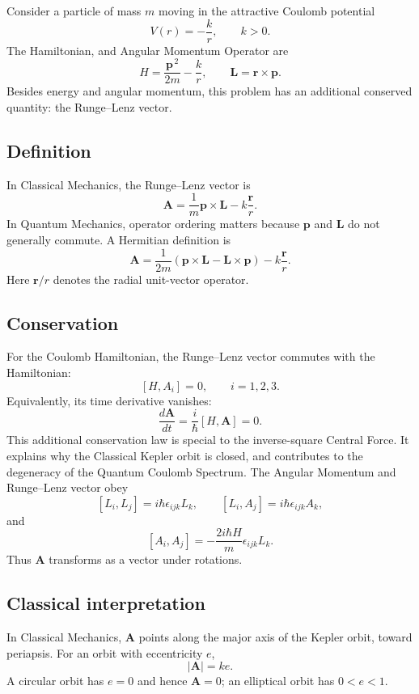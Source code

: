 \documentclass[a4paper, 10pt, onepage]{elegantbook}
\begin{document}
Consider a particle of mass \(m\) moving in the attractive Coulomb
potential
\[
V(r)=-\frac{k}{r},\qquad k>0.
\]
The Hamiltonian, and Angular Momentum Operator are
\[
H=\frac{\mathbf{p}^{\,2}}{2m}-\frac{k}{r},
\qquad
\mathbf{L}=\mathbf{r}\times\mathbf{p}.
\]
Besides energy and angular momentum, this problem has an additional
conserved quantity: the Runge--Lenz vector.

\subsection{Definition}

In Classical Mechanics, the Runge--Lenz vector is
\[
\mathbf{A}
=\frac{1}{m}\mathbf{p}\times\mathbf{L}
-k\frac{\mathbf{r}}{r}.
\]
In Quantum Mechanics, operator ordering matters because
\(\mathbf{p}\) and \(\mathbf{L}\) do not generally commute. A Hermitian
definition is
\[
\boxed{
\mathbf{A}
=\frac{1}{2m}
\left(\mathbf{p}\times\mathbf{L}
      -\mathbf{L}\times\mathbf{p}\right)
-k\frac{\mathbf{r}}{r}
}.
\]
Here \(\mathbf{r}/r\) denotes the radial unit-vector operator.

\subsection{Conservation}

For the Coulomb Hamiltonian, the Runge--Lenz vector commutes with the
Hamiltonian:
\[
[H,A_i]=0,\qquad i=1,2,3.
\]
Equivalently, its time derivative vanishes:
\[
\frac{d\mathbf{A}}{dt}
=\frac{i}{\hbar}[H,\mathbf{A}]=0.
\]
This additional conservation law is special to the inverse-square Central Force. It explains why the Classical Kepler orbit is closed, and contributes to the degeneracy of the Quantum Coulomb Spectrum. The Angular Momentum and Runge--Lenz vector obey
\[
[L_i,L_j]=i\hbar\epsilon_{ijk}L_k,
\qquad
[L_i,A_j]=i\hbar\epsilon_{ijk}A_k,
\]
and
\[
[A_i,A_j]=-\frac{2i\hbar H}{m}\epsilon_{ijk}L_k.
\]
Thus \(\mathbf{A}\) transforms as a vector under rotations.

\subsection{Classical interpretation}

In Classical Mechanics, \(\mathbf{A}\) points along the major axis of the Kepler orbit, toward periapsis. For an orbit with eccentricity
\(e\),
\[
|\mathbf{A}|=ke.
\]
A circular orbit has \(e=0\) and hence \(\mathbf{A}=0\); an elliptical orbit has \(0<e<1\).
\end{document}

